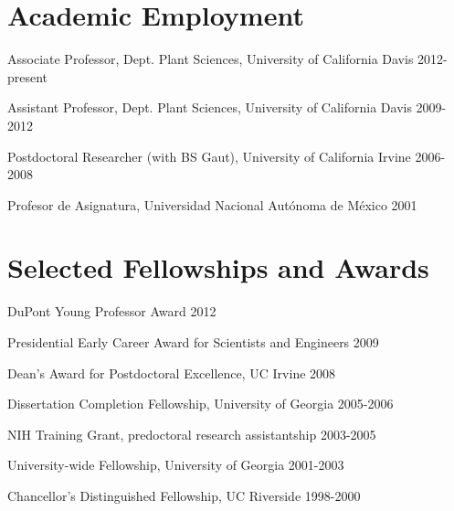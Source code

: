 \documentclass[letterpaper]{article}
\renewenvironment{itemize}{
  \begin{list}{}{
    \setlength{\leftmargin}{1.5em}
  }
}{
  \end{list}
}
\begin{document}
\section*{Academic Employment}
\begin{itemize}
\item Associate Professor, Dept. Plant Sciences, University of California Davis 2012-present
\item Assistant Professor, Dept. Plant Sciences, University of California Davis 2009-2012
\item Postdoctoral Researcher (with BS Gaut), University of California Irvine 2006-2008
\item Profesor de Asignatura, Universidad Nacional Aut\'{o}noma de M\'{e}xico 2001
\end{itemize}

\section*{Selected Fellowships and Awards}
\begin {itemize}

\item DuPont Young Professor Award 2012 
\item Presidential Early Career Award for Scientists and Engineers 2009
\item Dean's Award for Postdoctoral Excellence, UC Irvine 2008
\item Dissertation Completion Fellowship, University of Georgia 2005-2006
\item NIH Training Grant, predoctoral research assistantship 2003-2005
\item University-wide Fellowship, University of Georgia 2001-2003
\item Chancellor's Distinguished Fellowship, UC Riverside 1998-2000
\end{itemize}
\end{document}
